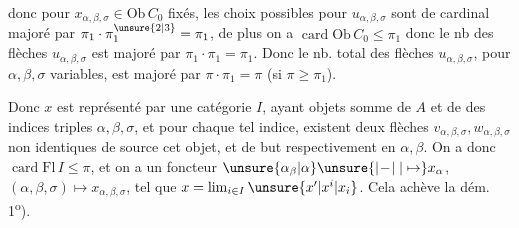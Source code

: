 donc pour $x_{\alpha,\beta,\sigma}\in\mathrm{Ob}\,C_0$ fixés, les choix possibles pour $u_{\alpha,\beta,\sigma}$ sont de cardinal majoré par $\pi_1\cdot\pi_1^{\unsure{2|3}}=\pi_1$, de plus on a $\operatorname{card}\mathrm{Ob}\,C_0\leq\pi_1$ donc le nb  des flèches $u_{\alpha,\beta,\sigma}$   est majoré par $\pi_1\cdot\pi_1=\pi_1$. Donc le nb. total des flèches $u_{\alpha,\beta,\sigma}$, pour $\alpha,\beta,\sigma$ variables, est majoré par $\pi\cdot\pi_1=\pi$ (si $\pi\geq\pi_1$).

Donc $x$ est représenté par une catégorie $I$, ayant   objets    somme de $A$ et de
des indices triples $\alpha,\beta,\sigma$, et pour chaque tel indice, existent deux flèches $v_{\alpha,\beta,\sigma},w_{\alpha,\beta,\sigma}$ non identiques de source cet  objet,  et de but respectivement en $\alpha,\beta$. On a  donc $\operatorname{card}\mathrm{Fl}\,I\leq\pi$, et on a un foncteur
$\unsure{\alpha_\beta|\alpha}\unsure{\mathrel{\vert\!-\!\vert}|\mapsto}x_\alpha$, $(\alpha,\beta,\sigma)\mapsto x_{\alpha,\beta,\sigma}$, tel que $x=\lim_{i\in I}\unsure{x'|x^i|x_i}$. Cela achève la dém.  1\textsuperscript{o}).

